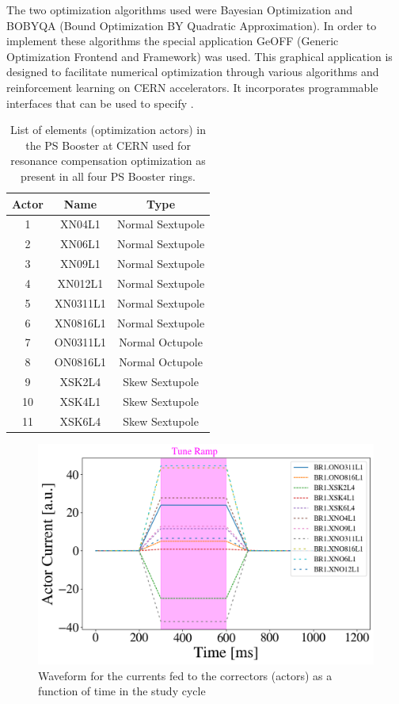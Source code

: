 The two optimization algorithms used were Bayesian Optimization and BOBYQA (Bound Optimization BY Quadratic Approximation). In order to implement these algorithms the special application GeOFF (Generic Optimization Frontend and Framework) was used. This graphical application is designed to facilitate numerical optimization through various algorithms and reinforcement learning on CERN accelerators. It incorporates programmable interfaces that can be used to specify  \cite{geoff}. 

\begin{table}[H]
    \centering
    \caption{List of elements (optimization actors) in the PS Booster at CERN used for resonance compensation optimization as present in all four PS Booster rings.}
    \label{tab:psbcomp}
    \begin{tabular}{|c|c|c|}
    \hline
    \textbf{Actor} & \textbf{Name} & \textbf{Type}    \\ \hline
    1 & XN04L1    & Normal Sextupole \\ \hline
    2 & XN06L1    & Normal Sextupole \\ \hline
    3 & XN09L1    & Normal Sextupole \\ \hline
    4 & XN012L1    & Normal Sextupole \\ \hline
    5 & XN0311L1    & Normal Sextupole   \\ \hline
    6 & XN0816L1    & Normal Sextupole   \\ \hline
    7 & ON0311L1    & Normal Octupole  \\ \hline
    8 & ON0816L1    & Normal Octupole   \\ \hline
    9 & XSK2L4    & Skew Sextupole  \\ \hline
    10 & XSK4L1    & Skew Sextupole   \\ \hline
    11 & XSK6L4    & Skew Sextupole   \\ \hline
    \end{tabular}
\end{table}

\begin{figure}[H]
    \centering
    \includegraphics[width=\linewidth]{chapter5/actor_currents.png}
    \caption{Waveform for the currents fed to the correctors (actors) as a function of time in the study cycle}
    \label{fig:actorcurrents}
\end{figure}


